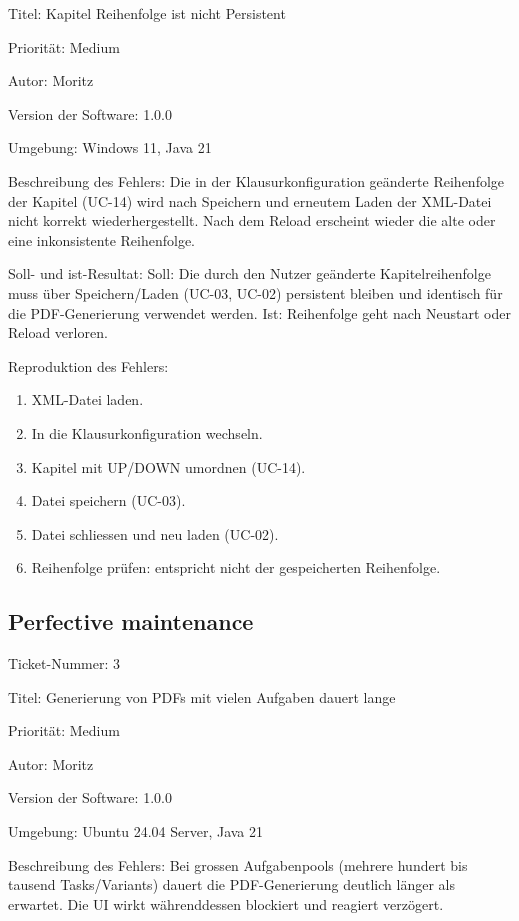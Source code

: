 \documentclass[a4paper]{article}
\begin{document}
Titel: Kapitel Reihenfolge ist nicht Persistent

Priorität: Medium

Autor: Moritz

Version der Software: 1.0.0

Umgebung: Windows 11, Java 21

Beschreibung des Fehlers: Die in der Klausurkonfiguration geänderte Reihenfolge der Kapitel (UC-14) wird nach Speichern und erneutem Laden der XML-Datei nicht korrekt wiederhergestellt. Nach dem Reload erscheint wieder die alte oder eine inkonsistente Reihenfolge.

Soll- und ist-Resultat: Soll: Die durch den Nutzer geänderte Kapitelreihenfolge muss über Speichern/Laden (UC-03, UC-02) persistent bleiben und identisch für die PDF-Generierung verwendet werden. Ist: Reihenfolge geht nach Neustart oder Reload verloren.

Reproduktion des Fehlers: 

\begin{enumerate}
    \item XML-Datei laden.
    \item In die Klausurkonfiguration wechseln.
    \item Kapitel mit UP/DOWN umordnen (UC-14).
    \item Datei speichern (UC-03).
    \item Datei schliessen und neu laden (UC-02).
    \item Reihenfolge prüfen: entspricht nicht der gespeicherten Reihenfolge.
\end{enumerate}

\subsection*{Perfective maintenance}

Ticket-Nummer: 3

Titel: Generierung von PDFs mit vielen Aufgaben dauert lange

Priorität: Medium

Autor: Moritz

Version der Software: 1.0.0

Umgebung: Ubuntu 24.04 Server, Java 21

Beschreibung des Fehlers: Bei grossen Aufgabenpools (mehrere hundert bis tausend Tasks/Variants) dauert die PDF-Generierung deutlich länger als erwartet. Die UI wirkt währenddessen blockiert und reagiert verzögert.
\end{document}

